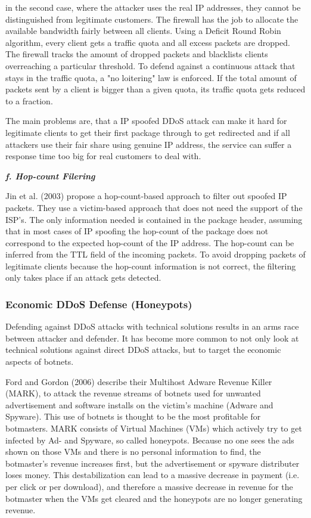 in the second case, where the attacker uses the real IP addresses, they cannot be distinguished from legitimate customers. The firewall has the job to allocate the available bandwidth fairly between all clients. Using a Deficit Round Robin algorithm, every client gets a traffic quota and all excess packets are dropped. The firewall tracks the amount of dropped packets and blacklists clients overreaching a particular threshold. To defend against a continuous attack that stays in the traffic quota, a "no loitering" law is enforced. If the total amount of packets sent by a client is bigger than a given quota, its traffic quota gets reduced to a fraction.

The main problems are, that a IP spoofed DDoS attack can make it hard for legitimate clients to get their first package through to get redirected and if all attackers use their fair share using genuine IP address, the service can suffer a response time too big for real customers to deal with. \cite{Xu03}

\textbf{\textit{f. Hop-count Filering}}

Jin et al. (2003) propose a hop-count-based approach to filter out spoofed IP packets. They use a victim-based approach that does not need the support of the ISP's. The only information needed is contained in the package header, assuming that in most cases of IP spoofing the hop-count of the package does not correspond to the expected hop-count of the IP address. The hop-count can be inferred from the TTL field of the incoming packets. To avoid dropping packets of legitimate clients because the hop-count information is not correct, the filtering only takes place if an attack gets detected. \cite{Jin03} 

		\subsubsection{Economic DDoS Defense (Honeypots)}
Defending against DDoS attacks with technical solutions results in an arms race between attacker and defender. It has become more common to not only look at technical solutions against direct DDoS attacks, but to target the economic aspects of botnets.

Ford and Gordon (2006) describe their Multihost Adware Revenue Killer (MARK), to attack the revenue streams of botnets used for unwanted advertisement and software installs on the victim's machine (Adware and Spyware). This use of botnets is thought to be the most profitable for botmasters. MARK consists of Virtual Machines (VMs) which actively try to get infected by Ad- and Spyware, so called honeypots. Because no one sees the ads shown on those VMs and there is no personal information to find, the botmaster's revenue increases first, but the advertisement or spyware distributer loses money. This destabilization can lead to a massive decrease in payment (i.e. per click or per download), and therefore a massive decrease in revenue for the botmaster when the VMs get cleared and the honeypots are no longer generating revenue. \cite{Ford07}

